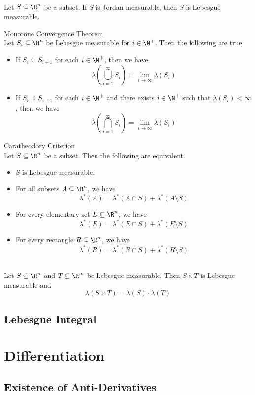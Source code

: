 \documentclass[a4paper]{article}
\begin{document}
\begin{lmm}{}{}\\
Let $S\subseteq\R^n$ be a subset. If $S$ is Jordan measurable, then $S$ is Lebesgue measurable. 
\end{lmm}

\begin{thm}{Monotone Convergence Theorem}{}\\
Let $S_i\subseteq\R^n$ be Lebesgue measurable for $i\in\N^+$. Then the following are true. 
\begin{itemize}
\item If $S_i\subseteq S_{i+1}$ for each $i\in\N^+$, then we have $$\lambda\left(\bigcup_{i=1}^\infty S_i\right)=\lim_{i\to\infty}\lambda(S_i)$$
\item If $S_i\supseteq S_{i+1}$ for each $i\in\N^+$ and there exists $i\in\N^+$ such that $\lambda(S_i)<\infty$, then we have $$\lambda\left(\bigcap_{i=1}^\infty S_i\right)=\lim_{i\to\infty}\lambda(S_i)$$
\end{itemize}
\end{thm}

\begin{thm}{Caratheodory Criterion}{}\\
Let $S\subseteq\R^n$ be a subset. Then the following are equivalent. 
\begin{itemize}
\item $S$ is Lebesgue measurable. 
\item For all subsets $A\subseteq\R^n$, we have $$\lambda^\ast(A)=\lambda^\ast(A\cap S)+\lambda^\ast(A\setminus S)$$
\item For every elementary set $E\subseteq\R^n$, we have $$\lambda^\ast(E)=\lambda^\ast(E\cap S)+\lambda^\ast(E\setminus S)$$
\item For every rectangle $R\subseteq\R^n$, we have $$\lambda^\ast(R)=\lambda^\ast(R\cap S)+\lambda^\ast(R\setminus S)$$
\end{itemize}
\end{thm}

\begin{prp}{}{}\\
Let $S\subseteq\R^n$ and $T\subseteq\R^m$ be Lebesgue measurable. Then $S\times T$ is Lebesgue measurable and $$\lambda(S\times T)=\lambda(S)\cdot\lambda(T)$$
\end{prp}

\subsection{Lebesgue Integral}


\pagebreak
\section{Differentiation}
\subsection{Existence of Anti-Derivatives}
\end{document}

